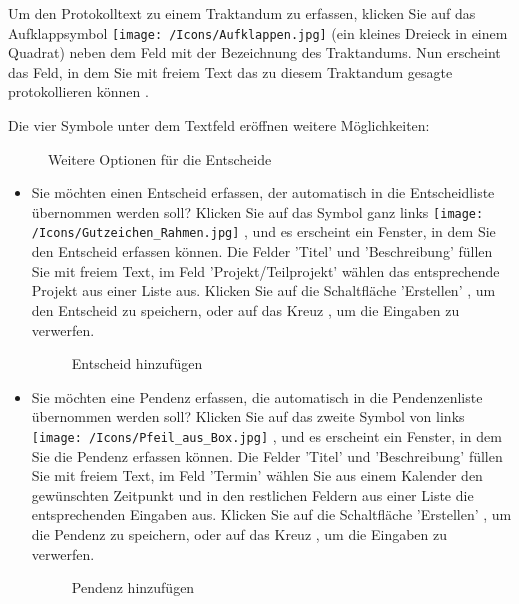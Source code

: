 Um den Protokolltext zu einem Traktandum zu erfassen, klicken Sie auf das Aufklappsymbol \texttt{[image: /Icons/Aufklappen.jpg]}  (ein kleines Dreieck in einem Quadrat) neben dem Feld mit der Bezeichnung des Traktandums. Nun erscheint das Feld, in dem Sie mit freiem Text das zu diesem Traktandum gesagte protokollieren können .

\vspace{\baselineskip}

Die vier Symbole unter dem Textfeld eröffnen weitere Möglichkeiten:

\begin{figure}[H]
\caption{Weitere Optionen für die Entscheide}
\end{figure}

\begin{itemize}
\item
Sie möchten einen Entscheid erfassen, der automatisch in die Entscheidliste übernommen werden soll? Klicken Sie auf das Symbol ganz links \texttt{[image: /Icons/Gutzeichen\_Rahmen.jpg]} , und es erscheint ein Fenster, in dem Sie den Entscheid erfassen können. Die Felder 'Titel'  und 'Beschreibung'  füllen Sie mit freiem Text, im Feld 'Projekt/Teilprojekt'  wählen das entsprechende Projekt aus einer Liste aus. Klicken Sie auf die Schaltfläche 'Erstellen' , um den Entscheid zu speichern, oder auf das Kreuz , um die Eingaben zu verwerfen.

\begin{figure}[H]
\caption{Entscheid hinzufügen}
\end{figure}

\end{itemize}

\begin{itemize}
\item
Sie möchten eine Pendenz erfassen, die automatisch in die Pendenzenliste übernommen werden soll? Klicken Sie auf das zweite Symbol von links \texttt{[image: /Icons/Pfeil\_aus\_Box.jpg]} , und es erscheint ein Fenster, in dem Sie die Pendenz erfassen können. Die Felder 'Titel'  und 'Beschreibung'  füllen Sie mit freiem Text, im Feld 'Termin'  wählen Sie aus einem Kalender den gewünschten Zeitpunkt und in den restlichen Feldern  aus einer Liste die entsprechenden Eingaben aus. Klicken Sie auf die Schaltfläche 'Erstellen' , um die Pendenz zu speichern, oder auf das Kreuz , um die Eingaben zu verwerfen.

\begin{figure}[H]
\caption{Pendenz hinzufügen}
\end{figure}

\end{itemize}

